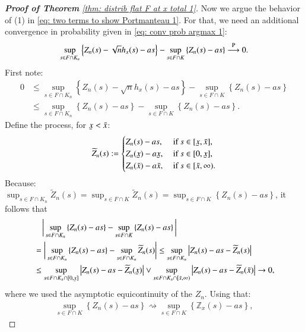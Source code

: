 \begin{proof}[\hypertarget{proof of thm 1 a}{\textbf{Proof of Theorem}} \ref{thm: distrib flat F at x total 1}]
Now we argue the behavior of (1) in \eqref{eq: two terms to show Portmanteau 1}. For that, we need an additional convergence in probability given in \eqref{eq: conv prob argmax 1}:
\begin{align}\label{eq: conv prob argmax 1}
    \sup_{s \in F \cap K_n} \left\{Z_n(s) - \sqrt{n} h_x(s) -as\right\} - \sup_{s \in F \cap K} \left\{Z_n(s) -as\right\} \stackrel{\mathrm{P}}{\longrightarrow} 0.
\end{align}
First note:
\begin{align*}
    0 &\leq \sup_{s \in F \cap K_n} \left\{Z_n(s) - \sqrt{n} h_x(s) -as\right\} - \sup_{s \in F \cap K} \left\{Z_n(s) -as\right\} \\
    & \leq \sup_{s \in F \cap K_n} \left\{Z_n(s) -as\right\} - \sup_{s \in F \cap K} \left\{Z_n(s) -as\right\}.
\end{align*}
Define the process, for $\ubar{x}<\bar{x}$:
\begin{align*}
    \widetilde{Z}_n(s) := \begin{cases}{Z_n(s)-as,} & \text { if } s \in [\ubar{x},\bar{x}], \\ Z_n(\ubar{x})-a\ubar{x}, & \text { if } s \in [0,\ubar{x}], \\ Z_n(\bar{x})-a\bar{x}, & \text { if } s \in [\bar{x},\infty). \end{cases}
\end{align*}
Because: $\sup_{s \in F \cap K_n} \widetilde{Z}_n(s) = \sup_{s \in F \cap K}  \widetilde{Z}_n(s) = \sup_{s \in F \cap K} \left\{Z_n(s) -as\right\}$, it follows that
\begin{align*}
    &\quad \bigg| \sup_{s \in F \cap K_n} \left\{Z_n(s) -as\right\} - \sup_{s \in F \cap K} \left\{Z_n(s) -as\right\} \bigg| \\
    &= \bigg| \sup_{s \in F \cap K_n} \left\{Z_n(s) -as\right\} - \sup_{s \in F \cap K_n} \widetilde{Z}_n(s) \bigg| \leq \sup_{s \in F \cap K_n} \big| Z_n(s) - as - \widetilde{Z}_n(s) \big| \\
    & \leq \sup_{s \in F \cap K_n \cap [0,\ubar{x}]} \big| Z_n(s) - as - \widetilde{Z}_n(\ubar{x}) \big| \vee \sup_{s \in F \cap K_n \cap [\bar{x},\infty)} \big| Z_n(s) - as - \widetilde{Z}_n(\bar{x}) \big| \rightarrow 0,
\end{align*}
where we used the asymptotic equicontinuity of the $Z_n$.
Using that:
\begin{align*}
    \sup_{s \in F \cap K} \left\{Z_n(s) -as\right\} \rightsquigarrow \sup_{s \in F \cap K} \left\{\mathbb{Z}_x(s) -as\right\},
\end{align*}

\end{proof}
